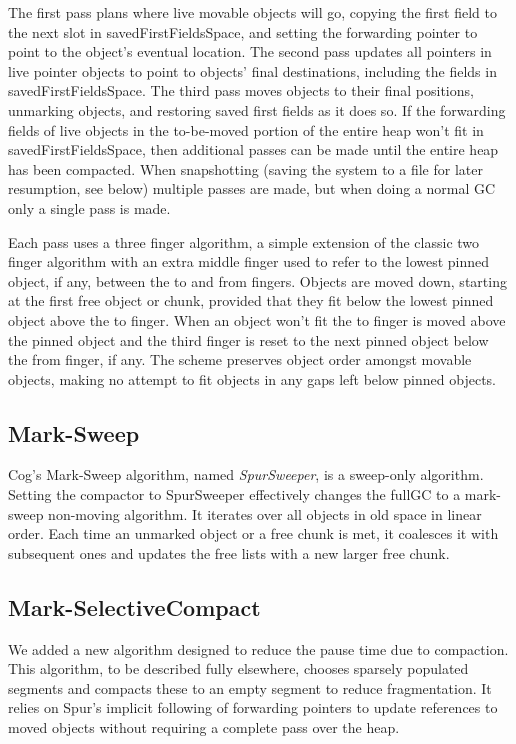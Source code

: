 \documentclass[10pt, sigplan]{acmart}
\begin{document}
The first pass plans where live movable objects will go, copying the first field to the next slot in savedFirstFieldsSpace, and setting the forwarding pointer to point to the object's eventual location. The second pass updates all pointers in live pointer objects to point to objects' final destinations, including the fields in savedFirstFieldsSpace. The third pass moves objects to their final positions, unmarking objects, and restoring saved first fields as it does so. If the forwarding fields of live objects in the to-be-moved portion of the entire heap won't fit in savedFirstFieldsSpace, then additional passes can be made until the entire heap has been compacted.  When snapshotting (saving the system to a file for later resumption, see below) multiple passes are made, but when doing a normal GC only a single pass is made.

Each pass uses a three finger algorithm, a simple extension of the classic two finger algorithm with an extra middle finger used to refer to the lowest pinned object, if any, between the to and from fingers.  Objects are moved down, starting at the first free object or chunk, provided that they fit below the lowest pinned object above the to finger.  When an object won't fit the to finger is moved above the pinned object and the third finger is reset to the next pinned object below the from finger, if any.  The scheme preserves object order amongst movable objects, making no attempt to fit objects in any gaps left below pinned objects.

\subsection{Mark-Sweep} \label{sec:refms}

Cog's Mark-Sweep algorithm, named \emph{SpurSweeper}, is a sweep-only algorithm.  Setting the compactor to SpurSweeper effectively changes the fullGC to a mark-sweep non-moving algorithm. It iterates over all objects in old space in linear order. Each time an unmarked object or a free chunk is met, it coalesces it with subsequent ones and updates the free lists with a new larger free chunk.

\subsection{Mark-SelectiveCompact}
We added a new algorithm designed to reduce the pause time due to compaction.  This algorithm, to be described fully elsewhere, chooses sparsely populated segments and compacts these to an empty segment to reduce fragmentation.  It relies on Spur's implicit following of forwarding pointers to update references to moved objects without requiring a complete pass over the heap. 
\end{document}

